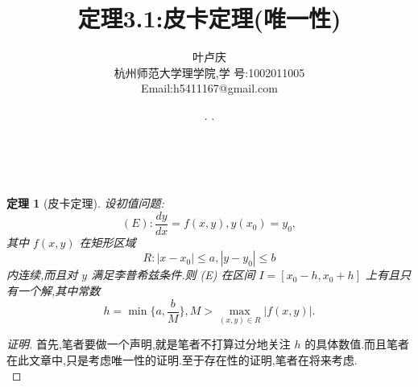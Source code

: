 \documentclass[a4paper, 12pt]{article} %
\makeatletter
\newtheorem*{adtheorem}{定理}
\newenvironment{theorem}
{\bigskip\begin{mdframed}[backgroundcolor=gray!40,rightline=false,leftline=false,topline=false,bottomline=false]\begin{adtheorem}}
    {\end{adtheorem}\end{mdframed}\bigskip}
\renewcommand{\maketitle}{ %
  \renewcommand\refname{参考文献}
  \newcommand{\D}{\displaystyle}\newcommand{\ri}{\Rightarrow}
  \newcommand{\ds}{\displaystyle} \renewcommand{\ni}{\noindent}
  \newcommand{\pa}{\partial} \newcommand{\Om}{\Omega}
  \newcommand{\om}{\omega} \newcommand{\sik}{\sum_{i=1}^k}
  \newcommand{\vov}{\Vert\omega\Vert} \newcommand{\Umy}{U_{\mu_i,y^i}}
  \newcommand{\lamns}{\lambda_n^{^{\scriptstyle\sigma}}}
  \newcommand{\chiomn}{\chi_{_{\Omega_n}}}
  \newcommand{\ullim}{\underline{\lim}} \newcommand{\bsy}{\boldsymbol}
  \newcommand{\mvb}{\mathversion{bold}} \newcommand{\la}{\lambda}
  \newcommand{\La}{\Lambda} \newcommand{\va}{\varepsilon}
  \newcommand{\be}{\beta} \newcommand{\al}{\alpha}
  \newcommand{\dis}{\displaystyle} \newcommand{\R}{{\mathbb R}}
  \newcommand{\N}{{\mathbb N}} \newcommand{\cF}{{\mathcal F}}
  \newcommand{\gB}{{\mathfrak B}} \newcommand{\eps}{\epsilon}
  \begin{flushright} %
    {\LARGE\@title} %
    
    \vspace{50pt} %
    
    {\large\@author} %
    \\\@date %
    
    \vspace{40pt} %
  \end{flushright}
}
\makeatother
\begin{document}
\begin{CJK}{UTF8}{gkai}
  \title{\textbf{定理3.1:皮卡定理(唯一性)}}
  \author{\small{叶卢庆}\\{\small{杭州师范大学理学院,学
        号:1002011005}}\\{\small{Email:h5411167@gmail.com}}} %
  \renewcommand{\today}{\number\year. \number\month. \number\day}
  \date{\today} %
  
  
  
  \maketitle %
  
  
  
  
  
  
  
  \begin{theorem}[皮卡定理]
 设初值问题:
$$
(E):\frac{dy}{dx}=f(x,y),y(x_0)=y_0,
$$
其中 $f(x,y)$ 在矩形区域
$$
R:|x-x_0|\leq a,|y-y_0|\leq b
$$
内连续,而且对 $y$ 满足李普希兹条件.则 (E) 在区间 $I=[x_0-h,x_0+h]$ 上有且只
有一个解,其中常数
$$
h=\min\{a,\frac{b}{M}\},M>\max_{(x,y)\in R}|f(x,y)|.
$$
\end{theorem}
\begin{proof}[证明]
首先,笔者要做一个声明,就是笔者不打算过分地关注 $h$ 的具体数值.而且笔者
在此文章中,只是考虑唯一性的证明.至于存在性的证明,笔者在将来考虑.\\


\end{proof}
\end{CJK}
\end{document}
